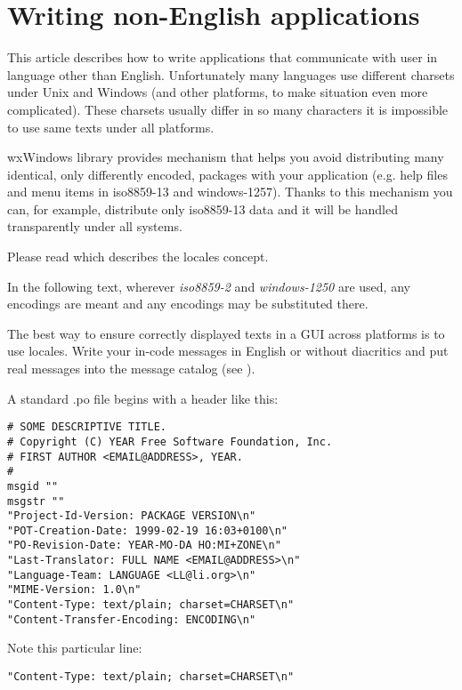 \section{Writing non-English applications}\label{nonenglishoverview}

This article describes how to write applications that communicate with
user in language other than English. Unfortunately many languages use
different charsets under Unix and Windows (and other platforms, to make
situation even more complicated). These charsets usually differ in so
many characters it is impossible to use same texts under all platforms.

wxWindows library provides mechanism that helps you avoid distributing many
identical, only differently encoded, packages with your application 
(e.g. help files and menu items in iso8859-13 and windows-1257). Thanks
to this mechanism you can, for example, distribute only iso8859-13 data 
and it will be handled transparently under all systems.

Please read  which
describes the locales concept.

In the following text, wherever {\it iso8859-2} and {\it windows-1250} are
used, any encodings are meant and any encodings may be substituted there.


The best way to ensure correctly displayed texts in a GUI across platforms
is to use locales. Write your in-code messages in English or without 
diacritics and put real messages into the message catalog (see 
).

A standard .po file begins with a header like this:

\begin{verbatim}
# SOME DESCRIPTIVE TITLE.
# Copyright (C) YEAR Free Software Foundation, Inc.
# FIRST AUTHOR <EMAIL@ADDRESS>, YEAR.
#
msgid ""
msgstr ""
"Project-Id-Version: PACKAGE VERSION\n"
"POT-Creation-Date: 1999-02-19 16:03+0100\n"
"PO-Revision-Date: YEAR-MO-DA HO:MI+ZONE\n"
"Last-Translator: FULL NAME <EMAIL@ADDRESS>\n"
"Language-Team: LANGUAGE <LL@li.org>\n"
"MIME-Version: 1.0\n"
"Content-Type: text/plain; charset=CHARSET\n"
"Content-Transfer-Encoding: ENCODING\n"
\end{verbatim}

Note this particular line:

\begin{verbatim}
"Content-Type: text/plain; charset=CHARSET\n"
\end{verbatim}

